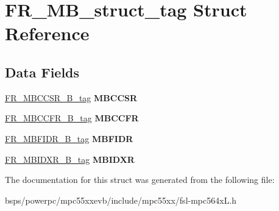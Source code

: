 \hypertarget{structFR__MB__struct__tag}{}\section{F\+R\+\_\+\+M\+B\+\_\+struct\+\_\+tag Struct Reference}
\label{structFR__MB__struct__tag}
\subsection*{Data Fields}
\begin{DoxyCompactItemize}
\item 
\mbox{\label{structFR__MB__struct__tag_a8065d2015232b6879e6f915c580ce413}} 
\mbox{\hyperlink{unionFR__MBCCSR__16B__tag}{F\+R\+\_\+\+M\+B\+C\+C\+S\+R\+\_\+B\+\_\+tag}} {\bfseries M\+B\+C\+C\+SR}
\item 
\mbox{\label{structFR__MB__struct__tag_a5d37c0ec05ed9a8ba0914b0e717451cb}} 
\mbox{\hyperlink{unionFR__MBCCFR__16B__tag}{F\+R\+\_\+\+M\+B\+C\+C\+F\+R\+\_\+B\+\_\+tag}} {\bfseries M\+B\+C\+C\+FR}
\item 
\mbox{\label{structFR__MB__struct__tag_a80c9ad71c92be525414bd187c73cfebf}} 
\mbox{\hyperlink{unionFR__MBFIDR__16B__tag}{F\+R\+\_\+\+M\+B\+F\+I\+D\+R\+\_\+B\+\_\+tag}} {\bfseries M\+B\+F\+I\+DR}
\item 
\mbox{\label{structFR__MB__struct__tag_a88b387b1a6354f33923313c27ec51184}} 
\mbox{\hyperlink{unionFR__MBIDXR__16B__tag}{F\+R\+\_\+\+M\+B\+I\+D\+X\+R\+\_\+B\+\_\+tag}} {\bfseries M\+B\+I\+D\+XR}
\end{DoxyCompactItemize}


The documentation for this struct was generated from the following file\+:\begin{DoxyCompactItemize}
\item 
bsps/powerpc/mpc55xxevb/include/mpc55xx/fsl-\/mpc564x\+L.\+h\end{DoxyCompactItemize}

